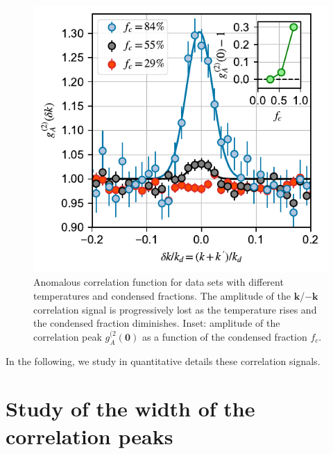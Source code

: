 \begin{figure}
    \centering
    \includegraphics{Fig/Chapter4/kmk_3_temp_errorbars.pdf}
    \caption[Anomalous correlation function for data sets with different temperatures and condensed fractions]{Anomalous correlation function for data sets with different temperatures and condensed fractions. The amplitude of the $\bm{k}$/$-\bm{k}$ correlation signal is progressively lost as the temperature rises and the condensed fraction diminishes. Inset: amplitude of the correlation peak $g^{(2}_{A}({\bm 0})$ as a function of the condensed fraction $f_c$.}
    \label{fig:kmk_3_temp}
\end{figure}

In the following, we study in quantitative details these correlation signals. 



\section{Study of the width of the correlation peaks}


